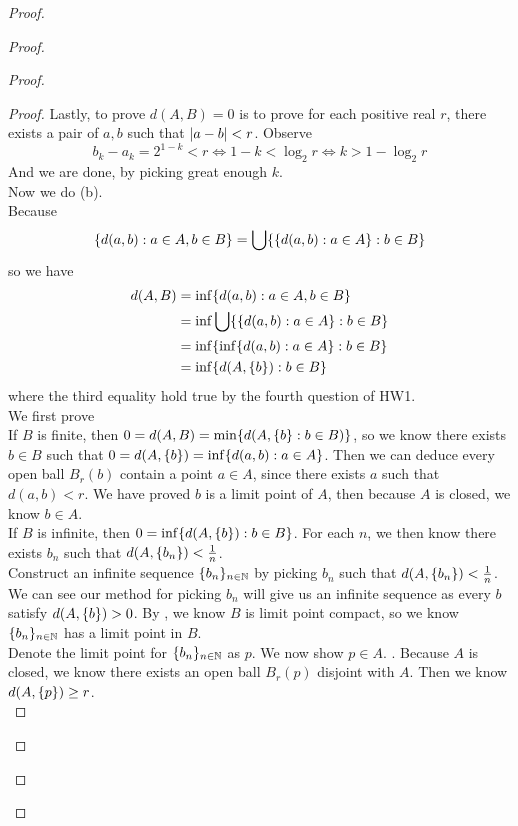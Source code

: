 \documentclass{report}
\begin{document}
\begin{proof}
\begin{proof}
\begin{proof}
\begin{proof}
Lastly, to prove $d(A,B)=0$ is to prove for each positive real $r$, there exists a pair of $a,b$ such that  $|a-b|<r$. Observe
 \begin{equation}
b_k-a_k=2^{1-k}<r\iff 1-k<\log_2 r\iff k>1-\log_2 r
\end{equation}
And we are done, by picking great enough $k$.\\



Now we do (b).\\

Because 
\begin{equation}
\{ d(a,b):a\in A,b\in B \}=\bigcup \{ \{ d(a,b):a\in A \}:b \in B \}
\end{equation}
so we have 
\begin{align}
d(A,B)&=\inf \{ d(a,b):a\in A,b\in B \}\\
&=\inf \bigcup \{ \{ d(a,b):a\in A \}:b\in B \}\\
&=\inf \{ \inf \{ d(a,b):a\in A \}:b\in B \}\\
&=\inf \{ d(A,\{ b \}):b \in B \}
\end{align}
where the third equality hold true by the fourth question of HW1.\\


We first prove \\

If $B$ is finite, then  $0=d(A,B)=\min \{ d(A,\{ b \}:b\in B) \}$, so we know there exists $b\in B$ such that $0=d(A,\{ b \})=\inf \{ d(a,b):a\in A \}$. Then we can deduce every open ball $B_r(b)$ contain a point $a\in A$, since there exists $a$ such that  $d(a,b)<r$. We have proved $b$ is a limit point of $A$, then because  $A$ is closed, we know  $b\in A$.\\

If $B$ is infinite, then  $0=\inf \{ d(A,\{ b \}):b\in B \}$. For each $n$, we then know there exists  $b_n$ such that  $d(A,\{ b_n \})<\frac{1}{n}$.\\


Construct an infinite sequence $\{ b_n \}_{n\in\mathbb{N}}$ by picking $b_n$ such that $d(A,\{ b_n \})<\frac{1}{n}$. We can see our method for picking $b_n$ will give us an infinite sequence as every $b$  satisfy  $d(A,\{ b \})>0$. By , we know $B$ is limit point compact, so we know $\{ b_n \}_{n\in\mathbb{N}}$ has a limit point in $B$.\\

Denote the limit point for $\{ b_n \}_{n\in\mathbb{N}}$ as $p$. We now show $p\in A$. . Because $A$ is closed, we know there exists an open ball  $B_r(p)$ disjoint with $A$. Then we know $d(A,\{ p \})\geq r$. \\


\end{proof}
\end{proof}
\end{proof}
\end{proof}
\end{document}
